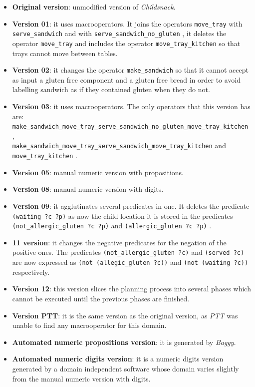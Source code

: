 \documentclass{article}
\newcommand{\cool}[1] {
        {\texttt{#1}}
    }
\begin{document}
    \begin{itemize}
        \item \textbf{Original version}: unmodified version of \textit{Childsnack}.
        \item \textbf{Version 01}: it uses macrooperators. It joins the operators \cool{move\_tray} with \cool{serve\_sandwich} and with \cool{serve\_sandwich\_no\_gluten}, it deletes the operator \cool{move\_tray} and includes the operator \cool{move\_tray\_kitchen} so that trays cannot move between tables.
        \item \textbf{Version 02}: it changes the operator \cool{make\_sandwich} so that it cannot accept as input a gluten free component and a gluten free bread in order to avoid labelling sandwich as if they contained gluten when they do not.
        \item \textbf{Version 03}: it uses macrooperators. The only operators that this version has are: \\ \cool{make\_sandwich\_move\_tray\_serve\_sandwich\_no\_gluten\_move\_tray\_kitchen}, \\ \cool{make\_sandwich\_move\_tray\_serve\_sandwich\_move\_tray\_kitchen} and \\ \cool{move\_tray\_kitchen}.
        \item \textbf{Version 05}: manual numeric version with propositions.
        \item \textbf{Version 08}: manual numeric version with digits.
        \item \textbf{Version 09}: it agglutinates several predicates in one. It deletes the predicate \cool{(waiting ?c ?p)} as now the child location it is stored in the predicates \cool{(not\_allergic\_gluten ?c ?p)} and \cool{(allergic\_gluten ?c ?p)}.
        \item \textbf{11 version}: it changes the negative predicates for the negation of the positive ones. The predicates \cool{(not\_allergic\_gluten ?c)} and \cool{(served ?c)} are now expressed as \cool{(not (allegic\_gluten ?c))} and \cool{(not (waiting ?c))} respectively.
        \item \textbf{Version 12}: this version slices the planning process into several phases which cannot be executed until the previous phases are finished.
        \item \textbf{Version PTT}: it is the same version as the original version, as \textit{PTT} was unable to find any macrooperator for this domain.
        \item \textbf{Automated numeric propositions version}: it is generated by \textit{Baggy}.
        \item \textbf{Automated numeric digits version}: it is a numeric digits version generated by a domain independent software whose domain varies slightly from the manual numeric version with digits.
    \end{itemize}
    
\end{document}
